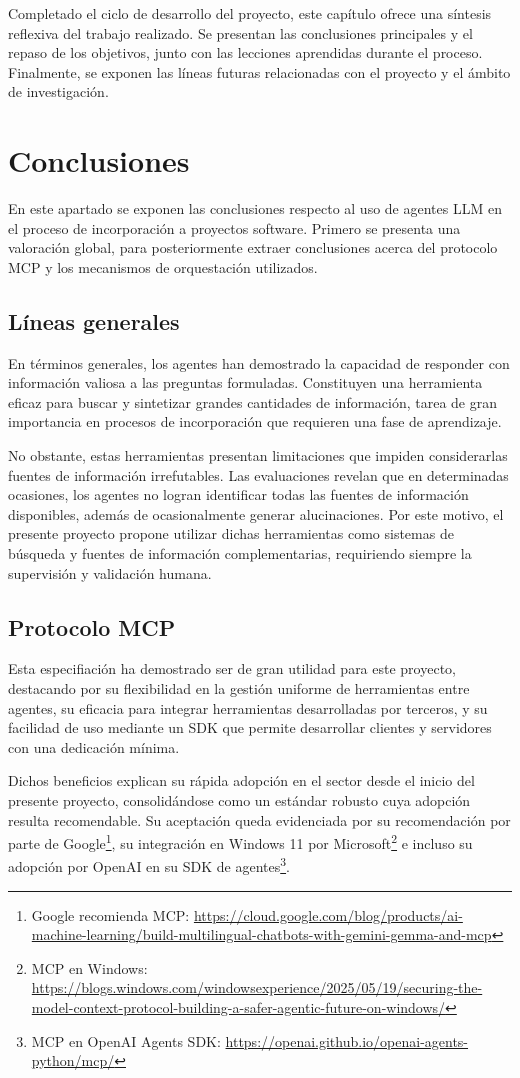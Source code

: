 Completado el ciclo de desarrollo del proyecto, este capítulo ofrece una síntesis reflexiva del trabajo realizado. Se presentan las conclusiones principales y el repaso de los objetivos, junto con las lecciones aprendidas durante el proceso. Finalmente, se exponen las líneas futuras relacionadas con el proyecto y el ámbito de investigación.

\section{Conclusiones}
En este apartado se exponen las conclusiones respecto al uso de agentes LLM en el proceso de incorporación a proyectos software. Primero se presenta una valoración global, para posteriormente extraer conclusiones acerca del protocolo MCP y los mecanismos de orquestación utilizados.

\subsection{Líneas generales}
En términos generales, los agentes han demostrado la capacidad de responder con información valiosa a las preguntas formuladas. Constituyen una herramienta eficaz para buscar y sintetizar grandes cantidades de información, tarea de gran importancia en procesos de incorporación que requieren una fase de aprendizaje.

No obstante, estas herramientas presentan limitaciones que impiden considerarlas fuentes de información irrefutables. Las evaluaciones revelan que en determinadas ocasiones, los agentes no logran identificar todas las fuentes de información disponibles, además de ocasionalmente generar alucinaciones. Por este motivo, el presente proyecto propone utilizar dichas herramientas como sistemas de búsqueda y fuentes de información complementarias, requiriendo siempre la supervisión y validación humana.

\subsection{Protocolo MCP}
Esta especifiación ha demostrado ser de gran utilidad para este proyecto, destacando por su flexibilidad en la gestión uniforme de herramientas entre agentes, su eficacia para integrar herramientas desarrolladas por terceros, y su facilidad de uso mediante un SDK que permite desarrollar clientes y servidores con una dedicación mínima.

Dichos beneficios explican su rápida adopción en el sector desde el inicio del presente proyecto, consolidándose como un estándar robusto cuya adopción resulta recomendable. Su aceptación queda evidenciada por su recomendación por parte de Google\footnote{Google recomienda MCP: \url{https://cloud.google.com/blog/products/ai-machine-learning/build-multilingual-chatbots-with-gemini-gemma-and-mcp}}, su integración en Windows 11 por Microsoft\footnote{MCP en Windows: \url{https://blogs.windows.com/windowsexperience/2025/05/19/securing-the-model-context-protocol-building-a-safer-agentic-future-on-windows/}} e incluso su adopción por OpenAI en su SDK de agentes\footnote{MCP en OpenAI Agents SDK: \url{https://openai.github.io/openai-agents-python/mcp/}}.

